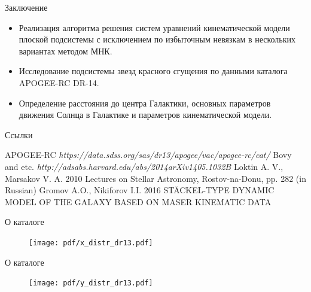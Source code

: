\documentclass{beamer}
\begin{document}
\begin{frame}{Заключение}
	\begin{itemize}
		\item Реализация алгоритма решения систем уравнений кинематической модели плоской подсистемы с исключением по избыточным невязкам в нескольких вариантах методом МНК.
		\item Исследование подсистемы звезд красного сгущения по данными каталога APOGEE-RC DR-14.
		\item Определение расстояния до центра Галактики, основных параметров движения Солнца в Галактике и параметров кинематической модели.
	\end{itemize}
\end{frame}


\begin{frame}{Ссылки}
 \begin{thebibliography}{10}
\beamertemplatebookbibitems
{} {\sc APOGEE-RC} {\em https://data.sdss.org/sas/dr13/apogee/vac/apogee-rc/cat/}
 {\sc Bovy and etc.} {\em http://adsabs.harvard.edu/abs/2014arXiv1405.1032B}
 {\sc Loktin A. V., Marsakov V. A. 2010} {Lectures on Stellar Astronomy, Rostov-na-Donu, pp. 282 (in Russian)}
 {\sc Gromov A.O., Nikiforov I.I. 2016} {STÄCKEL-TYPE DYNAMIC MODEL OF THE GALAXY BASED
ON MASER KINEMATIC DATA}

\end{thebibliography}
\end{frame}

\begin{frame}{О каталоге}
	\begin{center}
	\begin{figure}[h]
\begin{minipage}[h]{0.8\linewidth}
\texttt{[image: pdf/x\_distr\_dr13.pdf]}
\end{minipage}
\end{figure}
	\end{center}
\end{frame}

\begin{frame}{О каталоге}
	\begin{center}
	\begin{figure}[h]
\begin{minipage}[h]{0.8\linewidth}
\texttt{[image: pdf/y\_distr\_dr13.pdf]}
\end{minipage}
\end{figure}
	\end{center}
\end{frame}
\end{document}

